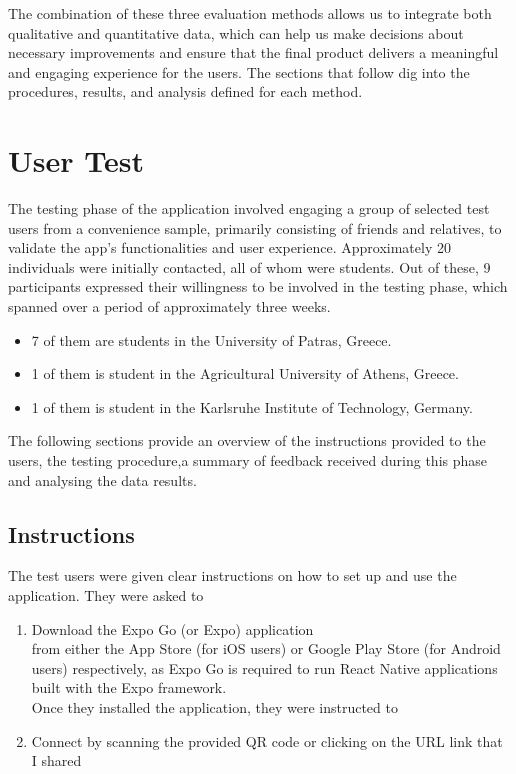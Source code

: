 \noindent The combination of these three evaluation methods allows us to integrate both qualitative and quantitative data, which can help us make decisions about necessary improvements and ensure that the final product delivers a meaningful and engaging experience for the users. The sections that follow dig into the procedures, results, and analysis defined for each method.

\section{User Test}

The testing phase of the application involved engaging a group of selected test users from a convenience sample, primarily consisting of friends and relatives, to validate the app's functionalities and user experience. Approximately 20 individuals were initially contacted, all of whom were students. Out of these, 9 participants expressed their willingness to be involved in the testing phase, which spanned over a period of approximately three weeks.
\begin{itemize}
    \item 7 of them are students in the University of Patras, Greece.
    \item 1 of them is student in the Agricultural University of Athens, Greece.
    \item 1 of them is student in the Karlsruhe Institute of Technology, Germany.
\end{itemize}
The following sections provide an overview of the instructions provided to the users, the testing procedure,a summary of feedback received during this phase and analysing the data results.

\subsection{Instructions}

The test users were given clear instructions on how to set up and use the application. They were asked to
\begin{enumerate}
    \item Download the Expo Go (or Expo) application \\
    from either the App Store (for iOS users) or Google Play Store (for Android users) respectively, as Expo Go is required to run React Native applications built with the Expo framework.\vspace{5mm} \\
    Once they installed the application, they were instructed to
    \item Connect by scanning the provided QR code or clicking on the URL link that I shared
\end{enumerate}

